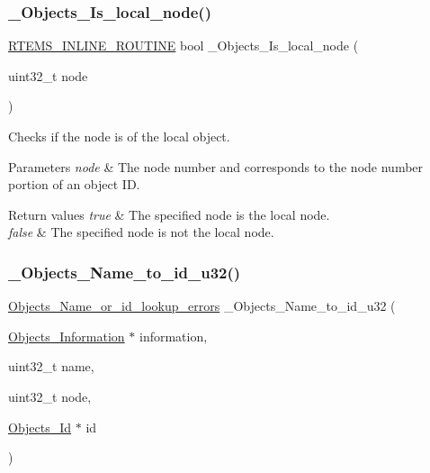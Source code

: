 \subsubsection{\texorpdfstring{\_Objects\_Is\_local\_node()}{\_Objects\_Is\_local\_node()}}
{\footnotesize\ttfamily \mbox{\hyperlink{group__RTEMSScoreBaseDefs_gac216239df231d5dbd15e3520b0b9313f}{R\+T\+E\+M\+S\+\_\+\+I\+N\+L\+I\+N\+E\+\_\+\+R\+O\+U\+T\+I\+NE}} bool \+\_\+\+Objects\+\_\+\+Is\+\_\+local\+\_\+node (\begin{DoxyParamCaption}\item[{uint32\+\_\+t}]{node }\end{DoxyParamCaption})}



Checks if the node is of the local object. 


\begin{DoxyParams}{Parameters}
{\em node} & The node number and corresponds to the node number portion of an object ID.\\
\hline
\end{DoxyParams}

\begin{DoxyRetVals}{Return values}
{\em true} & The specified node is the local node. \\
\hline
{\em false} & The specified node is not the local node. \\
\hline
\end{DoxyRetVals}
\mbox{\label{group__RTEMSScoreObject_ga115dd4137b68639f3dab80aad2f46ced}} 
\subsubsection{\texorpdfstring{\_Objects\_Name\_to\_id\_u32()}{\_Objects\_Name\_to\_id\_u32()}}
{\footnotesize\ttfamily \mbox{\hyperlink{group__RTEMSScoreObject_gaccfeec04954711c389b10aeccc91cabe}{Objects\+\_\+\+Name\+\_\+or\+\_\+id\+\_\+lookup\+\_\+errors}} \+\_\+\+Objects\+\_\+\+Name\+\_\+to\+\_\+id\+\_\+u32 (\begin{DoxyParamCaption}\item[{\mbox{\hyperlink{structObjects__Information}{Objects\+\_\+\+Information}} $\ast$}]{information,  }\item[{uint32\+\_\+t}]{name,  }\item[{uint32\+\_\+t}]{node,  }\item[{\mbox{\hyperlink{group__RTEMSScoreObject_ga5821f52a51072941bdd603e542d0863e}{Objects\+\_\+\+Id}} $\ast$}]{id }\end{DoxyParamCaption})}



